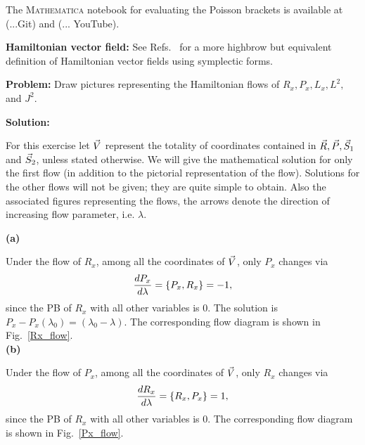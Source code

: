 The \textsc{Mathematica} notebook for evaluating the Poisson 
brackets is available at (...Git) and (... YouTube).




\hfill \break


\begin{definition}[label=def:BB]
\textbf{Hamiltonian vector field:}
See Refs.~\cite{jose, arnold} for a more highbrow but
equivalent definition of Hamiltonian vector fields
using symplectic forms.
\end{definition}

\hfill \break




\begin{Exercise}    \label{exercise-2}
\textbf{Problem:}  Draw pictures representing the Hamiltonian
flows of $R_x, P_x, L_x, L^2,$ and $J^2$.



\textbf{Solution:} 

For this exercise let $\vec{V}$ represent the totality of 
coordinates contained in $\vec{R}, \vec{P}, \vec{S}_1$ and $\vec{S}_2$,
unless stated otherwise.
We will give the mathematical
 solution for only the first flow (in addition to the
pictorial representation of the flow).
Solutions for the other flows will not be given; they are quite
simple to obtain.
Also the associated figures representing the flows,
the arrows denote the direction of
increasing flow parameter, i.e. $\lambda$.






\textbf{(a)}

Under the flow of $R_x$, among all the
coordinates of $\vec{V}$, only $P_x$ changes via
\begin{align}
\frac{d P_x}{d \lambda}  =  \left\lbrace P_x, R_x \right\rbrace = -1,
\end{align}
since the PB of $R_x$ with all other variables is 0. 
The solution is $ P_x - P_x(\lambda_0) = (\lambda_0 -  \lambda).$
The  corresponding flow diagram is shown in
Fig.~\ref{Rx_flow}.\\




\textbf{(b)}

Under the flow of $P_x$, among all the
coordinates of $\vec{V}$, only $R_x$ changes via
\begin{align}
\frac{d R_x}{d \lambda}  =  \left\lbrace R_x, P_x \right\rbrace = 1,
\end{align}
since the PB of $R_x$ with all other variables is 0. The 
corresponding flow diagram is shown in
Fig.~\ref{Px_flow}.






\end{Exercise}
